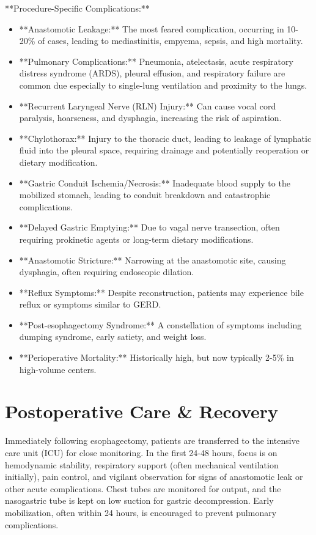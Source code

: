**Procedure-Specific Complications:**
\begin{itemize}
  \item **Anastomotic Leakage:** The most feared complication, occurring in 10-20\% of cases, leading to mediastinitis, empyema, sepsis, and high mortality.
  \item **Pulmonary Complications:** Pneumonia, atelectasis, acute respiratory distress syndrome (ARDS), pleural effusion, and respiratory failure are common due especially to single-lung ventilation and proximity to the lungs.
  \item **Recurrent Laryngeal Nerve (RLN) Injury:** Can cause vocal cord paralysis, hoarseness, and dysphagia, increasing the risk of aspiration.
  \item **Chylothorax:** Injury to the thoracic duct, leading to leakage of lymphatic fluid into the pleural space, requiring drainage and potentially reoperation or dietary modification.
  \item **Gastric Conduit Ischemia/Necrosis:** Inadequate blood supply to the mobilized stomach, leading to conduit breakdown and catastrophic complications.
  \item **Delayed Gastric Emptying:** Due to vagal nerve transection, often requiring prokinetic agents or long-term dietary modifications.
  \item **Anastomotic Stricture:** Narrowing at the anastomotic site, causing dysphagia, often requiring endoscopic dilation.
  \item **Reflux Symptoms:** Despite reconstruction, patients may experience bile reflux or symptoms similar to GERD.
  \item **Post-esophagectomy Syndrome:** A constellation of symptoms including dumping syndrome, early satiety, and weight loss.
  \item **Perioperative Mortality:** Historically high, but now typically 2-5\% in high-volume centers.
\end{itemize}

\section*{Postoperative Care \& Recovery}
Immediately following esophagectomy, patients are transferred to the intensive care unit (ICU) for close monitoring. In the first 24-48 hours, focus is on hemodynamic stability, respiratory support (often mechanical ventilation initially), pain control, and vigilant observation for signs of anastomotic leak or other acute complications. Chest tubes are monitored for output, and the nasogastric tube is kept on low suction for gastric decompression. Early mobilization, often within 24 hours, is encouraged to prevent pulmonary complications.

